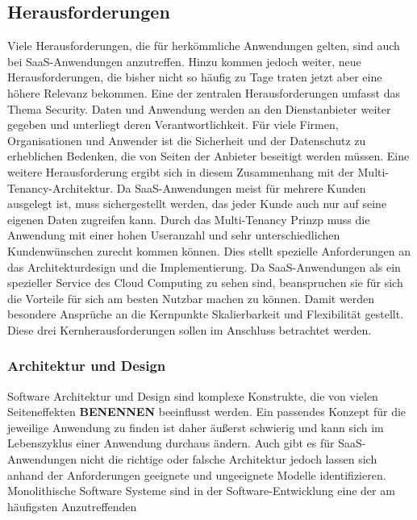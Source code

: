 \subsection{Herausforderungen}
Viele Herausforderungen, die für herkömmliche Anwendungen gelten, sind auch bei SaaS-Anwendungen anzutreffen. Hinzu kommen jedoch weiter, neue Herausforderungen, die bisher nicht so häufig zu Tage traten jetzt aber eine höhere Relevanz bekommen. Eine der zentralen Herausforderungen umfasst das Thema Security. Daten und Anwendung werden an den Dienstanbieter weiter gegeben und unterliegt deren Verantwortlichkeit. Für viele Firmen, Organisationen und Anwender ist die Sicherheit und der Datenschutz zu erheblichen Bedenken, die von Seiten der Anbieter beseitigt werden müssen. Eine weitere Herausforderung ergibt sich in diesem Zusammenhang mit der Multi-Tenancy-Architektur. Da SaaS-Anwendungen meist für mehrere Kunden ausgelegt ist, muss sichergestellt werden, das jeder Kunde auch nur auf seine eigenen Daten zugreifen kann. Durch das Multi-Tenancy Prinzp muss die Anwendung mit einer hohen Useranzahl und sehr unterschiedlichen Kundenwünschen zurecht kommen können. Dies stellt spezielle Anforderungen an das Architekturdesign und die Implementierung. Da SaaS-Anwendungen als ein spezieller Service des Cloud Computing zu sehen sind, beanspruchen sie für sich die Vorteile für sich am besten Nutzbar machen zu können. Damit werden besondere Ansprüche an die Kernpunkte Skalierbarkeit und Flexibilität gestellt. Diese drei Kernherausforderungen sollen im Anschluss betrachtet werden.


\subsubsection{Architektur und Design}
Software Architektur und Design sind komplexe Konstrukte, die von vielen Seiteneffekten \textbf{BENENNEN} beeinflusst werden. Ein passendes Konzept für die jeweilige Anwendung zu finden ist daher äußerst schwierig und kann sich im Lebenszyklus einer Anwendung durchaus ändern. Auch gibt es für SaaS-Anwendungen nicht die richtige oder falsche Architektur jedoch lassen sich anhand der Anforderungen geeignete und ungeeignete Modelle identifizieren.\\
Monolithische Software Systeme sind in der Software-Entwicklung eine der am häufigsten Anzutreffenden 

